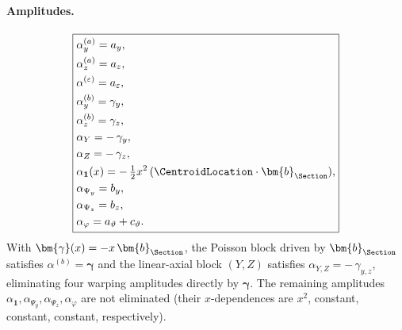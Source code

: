 \paragraph{Amplitudes.}
\begin{equation*}
\boxed{
\begin{aligned}
&\alpha^{(a)}_y=a_y,\\
&\alpha^{(a)}_z=a_z,\\ &\alpha^{(\varepsilon)}=a_\varepsilon,\\
&\alpha^{(b)}_y=\gamma_y,\\
&\alpha^{(b)}_z=\gamma_z,\\
&\alpha_{Y}=-\,\gamma_y,\\
&\alpha_{Z}=-\,\gamma_z,\\
&\alpha_{\mathbf{1}}(x)=-\,\tfrac{1}{2} x^2\,(\CentroidLocation\cdot\bm{b}_{\Section}),\\
&\alpha_{\Psi_y}=b_y,\\
&\alpha_{\Psi_z}=b_z,\\
&\alpha_{\varphi}=a_\vartheta+c_\vartheta.
\end{aligned}}
\end{equation*}
With \(\bm{\gamma}(x)=-x\,\bm{b}_{\Section}\), the Poisson block driven by \(\bm{b}_{\Section}\) satisfies
\(\alpha^{(b)}=\bm{\gamma}\) and the linear-axial block \((Y,Z)\) satisfies
\(\alpha_{Y,Z}=-\,\gamma_{y,z}\), eliminating four warping amplitudes directly by \(\bm{\gamma}\).
The remaining amplitudes \(\alpha_{\mathbf{1}},\alpha_{\Psi_y},\alpha_{\Psi_z},\alpha_{\varphi}\) are not eliminated
(their \(x\)-dependences are \(x^2\), constant, constant, constant, respectively).


